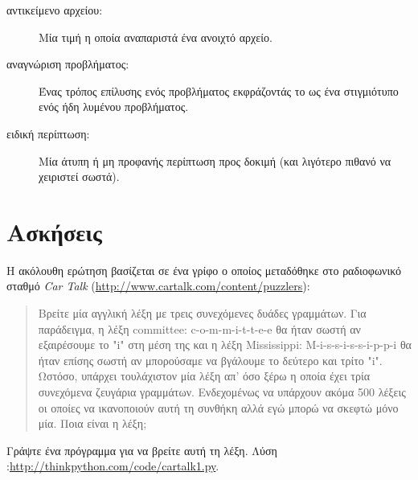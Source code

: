 \documentclass[10pt]{book}
\begin{document}
\begin{description}

\item[αντικείμενο αρχείου:] Μία τιμή η οποία αναπαριστά ένα ανοιχτό αρχείο.

\item[αναγνώριση προβλήματος:] Ένας τρόπος επίλυσης ενός προβλήματος εκφράζοντάς το ως ένα στιγμιότυπο ενός ήδη λυμένου προβλήματος.

\item[ειδική περίπτωση:] Μία άτυπη ή μη προφανής περίπτωση προς δοκιμή (και λιγότερο πιθανό να χειριστεί σωστά).

\end{description}


\section{Ασκήσεις}

\begin{exercise}

Η ακόλουθη ερώτηση βασίζεται σε ένα γρίφο ο οποίος μεταδόθηκε στο ραδιοφωνικό σταθμό {\em Car Talk} (\url{http://www.cartalk.com/content/puzzlers}):

\begin{quote}

Βρείτε μία αγγλική λέξη με τρεις συνεχόμενες δυάδες γραμμάτων. Για παράδειγμα, η λέξη  committee: c-o-m-m-i-t-t-e-e  θα ήταν σωστή αν εξαιρέσουμε το "i" στη μέση της και η λέξη Mississippi: M-i-s-s-i-s-s-i-p-p-i  θα ήταν επίσης σωστή αν μπορούσαμε να βγάλουμε το δεύτερο και τρίτο "i". Ωστόσο, υπάρχει τουλάχιστον μία λέξη απ' όσο ξέρω η οποία έχει τρία συνεχόμενα ζευγάρια γραμμάτων. Ενδεχομένως να υπάρχουν ακόμα 500 λέξεις οι οποίες να ικανοποιούν αυτή τη συνθήκη αλλά εγώ μπορώ να σκεφτώ μόνο μία. Ποια είναι η λέξη; 

\end{quote}

Γράψτε ένα πρόγραμμα για να βρείτε αυτή τη λέξη. Λύση :\url{http://thinkpython.com/code/cartalk1.py}.
\\
\end{exercise}
\end{document}
